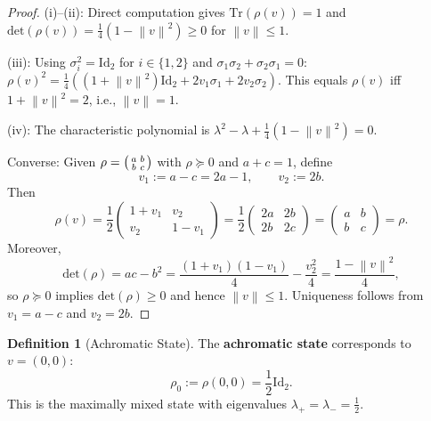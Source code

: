 \documentclass[11pt]{article}
\theoremstyle{plain}
\theoremstyle{definition}
\newtheorem{definition}[theorem]{Definition}
\theoremstyle{remark}
\newcommand{\norm}[1]{\left\lVert #1 \right\rVert}
\newcommand{\Tr}{\mathrm{Tr}}
\newcommand{\Det}{\mathrm{det}}
\newcommand{\Id}{\mathrm{Id}}
\begin{document}
\begin{proof}
(i)--(ii): Direct computation gives $\Tr(\rho(v)) = 1$ and $\Det(\rho(v)) = \frac{1}{4}(1 - \norm{v}^2) \geq 0$ for $\norm{v} \leq 1$.

(iii): Using $\sigma_i^2 = \Id_2$ for $i \in \{1, 2\}$ and $\sigma_1\sigma_2 + \sigma_2\sigma_1 = 0$:
$\rho(v)^2 = \frac{1}{4}( (1 + \norm{v}^2)\Id_2 + 2v_1\sigma_1 + 2v_2\sigma_2 )$.
This equals $\rho(v)$ iff $1 + \norm{v}^2 = 2$, i.e., $\norm{v} = 1$.

(iv): The characteristic polynomial is $\lambda^2 - \lambda + \frac{1}{4}(1-\norm{v}^2) = 0$.

Converse: Given $\rho = \begin{psmallmatrix} a & b \\ b & c \end{psmallmatrix}$ with $\rho \succeq 0$ and $a + c = 1$, define
\begin{equation}
v_1 := a - c = 2a - 1, \qquad v_2 := 2b.
\end{equation}
Then
\begin{equation}
\rho(v) = \frac{1}{2}\begin{pmatrix} 1 + v_1 & v_2 \\ v_2 & 1 - v_1 \end{pmatrix} = \frac{1}{2}\begin{pmatrix} 2a & 2b \\ 2b & 2c \end{pmatrix} = \begin{pmatrix} a & b \\ b & c \end{pmatrix} = \rho.
\end{equation}
Moreover,
\begin{equation}
\Det(\rho) = ac - b^2 = \frac{(1+v_1)(1-v_1)}{4} - \frac{v_2^2}{4} = \frac{1 - \norm{v}^2}{4},
\end{equation}
so $\rho \succeq 0$ implies $\Det(\rho) \geq 0$ and hence $\norm{v} \leq 1$. Uniqueness follows from $v_1 = a - c$ and $v_2 = 2b$.
\end{proof}

\begin{definition}[Achromatic State]
The \textbf{achromatic state} corresponds to $v = (0,0)$:
\begin{equation}
\rho_0 := \rho(0,0) = \frac{1}{2}\Id_2.
\end{equation}
This is the maximally mixed state with eigenvalues $\lambda_+ = \lambda_- = \frac{1}{2}$.
\end{definition}
\end{document}
